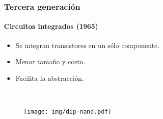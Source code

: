 \documentclass[11pt,a4paper,spanish]{beamer}
\begin{document}
\begin{frame}

\frametitle{Tercera generación}
\framesubtitle{Circuitos integrados (1965)}

\begin{minipage}{0.66\textwidth}
\begin{itemize}
    \item Se integran transistores en un sólo componente.
    \item Menor tamaño y costo.
    \item Facilita la abstracción.
\end{itemize}
\end{minipage}
~
\begin{minipage}{0.3\textwidth}
\begin{figure}
    \texttt{[image: img/dip-nand.pdf]}
    \captionsetup{textfont=tiny,labelformat=empty}
    \caption{}
\end{figure}
\end{minipage}

\end{frame}
\end{document}

